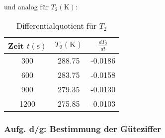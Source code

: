 und analog für $T_{2} (\unit{\kelvin})$:

\begin{table}
  \centering
  \caption{Differentialquotient für $T_{2}$}
  \label{tab:berechnete_werte_T2}
  \begin{tabular}{c c c}
    \toprule
    {Zeit $t (\unit{\second})$} &
    {$T_{2} (\unit{\kelvin})$} &
    {$\frac{dT_{2}}{dt}$} \\
    \midrule
     300 & 288.75 & -0.0186 \\
     600 & 283.75 & -0.0158 \\
     900 & 279.35 & -0.0130 \\
    1200 & 275.85 & -0.0103 \\
    \bottomrule
  \end{tabular}
\end{table}

\newpage

\subsubsection{Aufg. d/g: Bestimmung der Güteziffer}

